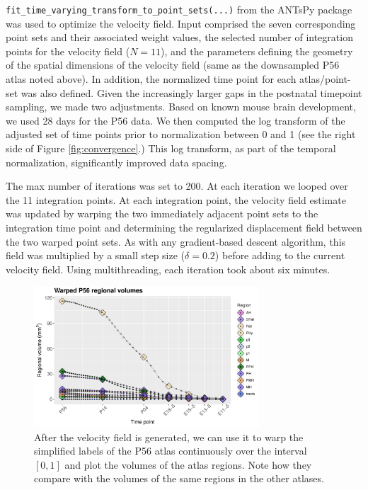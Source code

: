 \documentclass[
  12pt,
]{article}
\begin{document}
\texttt{fit\_time\_varying\_transform\_to\_point\_sets(...)} from the
ANTsPy package was used to optimize the velocity field. Input comprised
the seven corresponding point sets and their associated weight values,
the selected number of integration points for the velocity field
(\(N=11\)), and the parameters defining the geometry of the spatial
dimensions of the velocity field (same as the downsampled P56 atlas
noted above). In addition, the normalized time point for each
atlas/point-set was also defined. Given the increasingly larger gaps in
the postnatal timepoint sampling, we made two adjustments. Based on
known mouse brain development, we used 28 days for the P56 data. We then
computed the log transform of the adjusted set of time points prior to
normalization between 0 and 1 (see the right side of Figure
\ref{fig:convergence}.) This log transform, as part of the temporal
normalization, significantly improved data spacing.

The max number of iterations was set to 200. At each iteration we looped
over the 11 integration points. At each integration point, the velocity
field estimate was updated by warping the two immediately adjacent point
sets to the integration time point and determining the regularized
displacement field between the two warped point sets. As with any
gradient-based descent algorithm, this field was multiplied by a small
step size (\(\delta = 0.2\)) before adding to the current velocity
field. Using multithreading, each iteration took about six minutes.

\begin{figure}[!htb]
\centering
\includegraphics[width=0.75\textwidth]{Figures/warpedP56Volumes.pdf}
\caption{After the velocity field is generated, we can use it to warp
the simplified labels of the P56 atlas continuously over the interval
$[0, 1]$ and plot the volumes of the atlas regions.  Note how they 
compare with the volumes of the same regions in the other atlases.}
\label{fig:warpedP56}
\end{figure}
\end{document}
